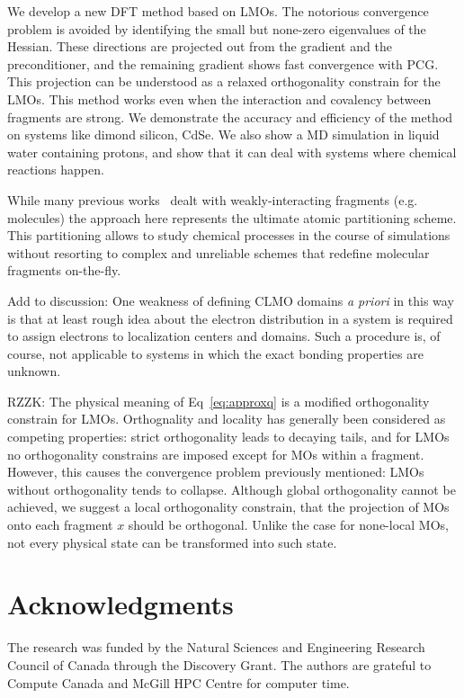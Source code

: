 \documentclass[aps,prl,twocolumn,reprint,amsmath,amssymb]{revtex4-1}
\begin{document}
\label{marker:conclusion} We develop a new DFT method based on LMOs. The notorious convergence problem is avoided by identifying the small but none-zero eigenvalues of the Hessian. These directions are projected out from the gradient and the preconditioner, and the remaining gradient shows fast convergence with PCG. This projection can be understood as a relaxed orthogonality constrain for the LMOs. This method works even when the interaction and covalency between fragments are strong. We demonstrate the accuracy and efficiency of the method on systems like dimond silicon, CdSe. We also show a MD simulation in liquid water containing protons, and show that it can deal with systems where chemical reactions happen.

While many previous works~\cite{RZZK} dealt with weakly-interacting fragments (e.g. molecules) the approach here represents the ultimate atomic partitioning scheme. This partitioning allows to study chemical processes in the course of simulations without resorting to complex and unreliable schemes that redefine molecular fragments on-the-fly.

Add to discussion: One weakness of defining CLMO domains \emph{a priori} in this way is that at least rough idea about the electron distribution in a system is required to assign electrons to localization centers and domains. Such a procedure is, of course, not applicable to systems in which the exact bonding properties are unknown.

RZZK: The physical meaning of Eq~\ref{eq:approxq} is a modified orthogonality constrain for LMOs. Orthognality and locality has generally been considered as competing properties: strict orthogonality leads to decaying tails, and for LMOs no orthogonality constrains are imposed except for MOs within a fragment. However, this causes the convergence problem previously mentioned: LMOs without orthogonality tends to collapse. Although global orthogonality cannot be achieved, we suggest a local orthogonality constrain, that the projection of MOs onto each fragment $x$ should be orthogonal. Unlike the case for none-local MOs, not every physical state can be transformed into such state.

\section{Acknowledgments} The research was funded by the Natural Sciences and Engineering Research Council of Canada through the Discovery Grant. The authors are grateful to Compute Canada and McGill HPC Centre for computer time.
\end{document}
